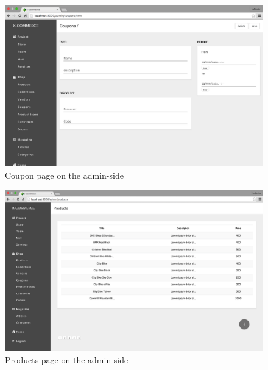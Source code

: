 \begin{figure}[htb]
\centering
\includegraphics[width=1.0\linewidth]{images/chapter4/page-coupon-all.png}\hfill
\caption[Coupon page on the admin-side]{Coupon page on the admin-side}
\label{fig:page_coupon_admin}
\end{figure}
\newpage
\begin{figure}[htb]
\centering
\includegraphics[width=1.0\linewidth]{images/chapter4/page-products-all.png}\hfill
\caption[Products page on the admin-side]{Products page on the admin-side}
\label{fig:page_products_admin}
\end{figure}
